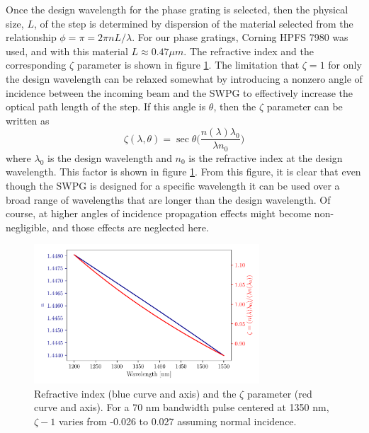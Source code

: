 Once the design wavelength for the phase grating is selected, then the physical size, $L$, of the step is determined by dispersion of the material selected from the relationship $\phi=\pi=2\pi n L/\lambda$.  For our phase gratings, Corning HPFS 7980 was used, and with this material $L\approx0.47\mu m$.  The refractive index and the corresponding $\zeta$ parameter is shown in figure \ref{fig:n_zeta}. The limitation that $\zeta=1$ for only the design wavelength can be relaxed somewhat by introducing a nonzero angle of incidence between the incoming beam and the SWPG to effectively increase the optical path length of the step.  If this angle is $\theta$, then the $\zeta$ parameter can be written as
\begin{equation}
\label{eqn:zeta_theta}
	\zeta(\lambda,\theta)=\sec\theta\bigg(  \frac{n(\lambda)\lambda_0}{\lambda n_0} \bigg)
\end{equation}
where $\lambda_0$ is the design wavelength and $n_0$ is the refractive index at the design wavelength.  This factor is shown in figure \ref{fig:n_zeta}.  From this figure, it is clear that even though the SWPG is designed for a specific wavelength it can be used over a broad range of wavelengths that are longer than the design wavelength. Of course, at higher angles of incidence propagation effects might become non-negligible, and those effects are neglected here. 
\begin{figure}
	\centering
	\includegraphics[width=0.75\textwidth]{figures/Two_source/n_zeta.pdf}
	\caption{Refractive index (blue curve and axis) and the $\zeta$ parameter (red curve and axis).  For a 70 nm bandwidth pulse centered at 1350 nm, $\zeta - 1$ varies from -0.026 to 0.027 assuming normal incidence.}
	\label{fig:n_zeta}
\end{figure}

